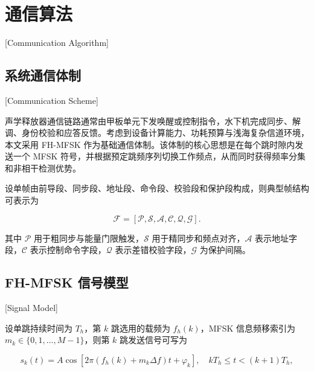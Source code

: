 
%
%

\chapter{通信算法}[Communication Algorithm]
\label{chap03}

\section{系统通信体制}[Communication Scheme]

声学释放器通信链路通常由甲板单元下发唤醒或控制指令，水下机完成同步、解调、身份校验和应答反馈。考虑到设备计算能力、功耗预算与浅海复杂信道环境，本文采用 FH-MFSK 作为基础通信体制。该体制的核心思想是在每个跳时隙内发送一个 MFSK 符号，并根据预定跳频序列切换工作频点，从而同时获得频率分集和非相干检测优势\cite{LiBoDuoYongHuShuiShengFHMFSKTongXinJiShuLiLunYuShiXianYanJiu2018,liuFHFSKRemoteControl2021}。

设单帧由前导段、同步段、地址段、命令段、校验段和保护段构成，则典型帧结构可表示为

\begin{equation}
  \mathcal{F}=\left[\mathcal{P},\mathcal{S},\mathcal{A},\mathcal{C},\mathcal{Q},\mathcal{G}\right].
\end{equation}

其中 $\mathcal{P}$ 用于粗同步与能量门限触发，$\mathcal{S}$ 用于精同步和频点对齐，$\mathcal{A}$ 表示地址字段，$\mathcal{C}$ 表示控制命令字段，$\mathcal{Q}$ 表示差错校验字段，$\mathcal{G}$ 为保护间隔。

\section{FH-MFSK 信号模型}[Signal Model]

设单跳持续时间为 $T_h$，第 $k$ 跳选用的载频为 $f_h(k)$，MFSK 信息频移索引为 $m_k \in \{0,1,\ldots,M-1\}$，则第 $k$ 跳发送信号可写为

\begin{equation}
  s_k(t)=A\cos\left[2\pi\left(f_h(k)+m_k\Delta f\right)t+\varphi_k\right],\quad kT_h \leq t < (k+1)T_h,
  \label{eq:fhmfsk_signal}
\end{equation}

